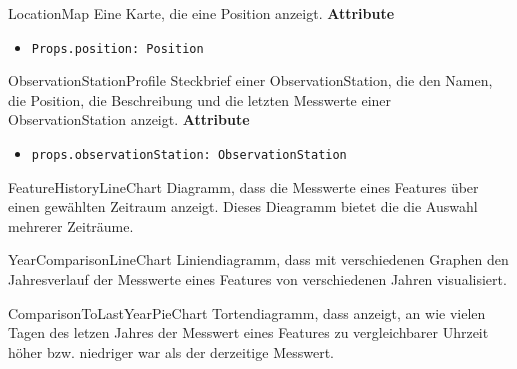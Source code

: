     \begin{Class}{LocationMap}
        Eine Karte, die eine Position anzeigt.
        \textbf{Attribute}
        \begin{itemize}
            \item \texttt{Props.position: Position}
        \end{itemize}
    \end{Class}

    \begin{Class}{ObservationStationProfile}
        Steckbrief einer ObservationStation, die den Namen, die Position, die Beschreibung und die letzten Messwerte einer ObservationStation anzeigt.
        \textbf{Attribute}
        \begin{itemize}
            \item \texttt{props.observationStation: ObservationStation}
        \end{itemize}
    \end{Class}

    \begin{Class}{FeatureHistoryLineChart}
        Diagramm, dass die Messwerte eines Features über einen gewählten Zeitraum anzeigt. Dieses Dieagramm bietet die die Auswahl mehrerer Zeiträume.
    \end{Class}

    \begin{Class}{YearComparisonLineChart}
        Liniendiagramm, dass mit verschiedenen Graphen den Jahresverlauf der Messwerte eines Features von verschiedenen Jahren visualisiert.
    \end{Class}

    \begin{Class}{ComparisonToLastYearPieChart}
        Tortendiagramm, dass anzeigt, an wie vielen Tagen des letzen Jahres der Messwert eines Features zu vergleichbarer Uhrzeit höher bzw. niedriger war als der derzeitige Messwert.
    \end{Class}


